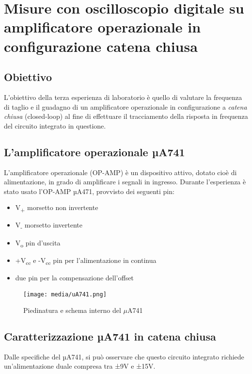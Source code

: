 \chapter{Misure con oscilloscopio digitale su amplificatore operazionale in configurazione catena chiusa}
\label{chap:terza_prova}

\section*{Obiettivo}
\label{sec:ob_third}
L'obiettivo della terza esperienza di laboratorio è quello di valutare la frequenza di taglio e il guadagno di un amplificatore operazionale in configurazione a \emph{catena chiusa} (closed-loop) al fine di effettuare il tracciamento della risposta in frequenza del circuito integrato in questione.

\section{L'amplificatore operazionale µA741}
L'amplificatore operazionale (OP-AMP) è un dispositivo attivo, dotato cioè di alimentazione, in grado  di amplificare i segnali in ingresso. Durante l'esperienza è stato usato l'OP-AMP µA471, provvisto dei seguenti pin:
\begin{itemize}
    \item V\textsubscript{+} morsetto non invertente
    \item V\textsubscript{-} morsetto invertente
    \item V\textsubscript{o} pin d'uscita
    \item +V\textsubscript{cc} e -V\textsubscript{cc} pin per l'alimentazione in continua
    \item due pin per la compensazione dell'offset
\end{itemize}

\begin{figure}
    \centering
    \texttt{[image: media/uA741.png]}
    \caption{Piedinatura e schema interno del $\mu$A741}
    \label{fig:Piedinatura e schema interno del uA741}
\end{figure}
\FloatBarrier
\section{Caratterizzazione µA741 in catena chiusa}
Dalle specifiche del µA741, si può osservare che questo circuito integrato richiede un’alimentazione duale compresa tra ±9V e ±15V.

